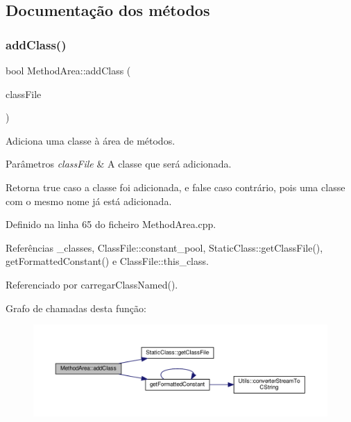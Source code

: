 \subsection{Documentação dos métodos}
\mbox{\label{classMethodArea_a9e4e378de46c1a9836820d86cd9dadb8}} 
\subsubsection{\texorpdfstring{add\+Class()}{addClass()}}
{\footnotesize\ttfamily bool Method\+Area\+::add\+Class (\begin{DoxyParamCaption}\item[{\hyperlink{classStaticClass}{Static\+Class} $\ast$}]{class\+File }\end{DoxyParamCaption})\hspace{0.3cm}{\ttfamily [private]}}



Adiciona uma classe à área de métodos. 


\begin{DoxyParams}{Parâmetros}
{\em class\+File} & A classe que será adicionada. \\
\hline
\end{DoxyParams}
\begin{DoxyReturn}{Retorna}
{\ttfamily true} caso a classe foi adicionada, e {\ttfamily false} caso contrário, pois uma classe com o mesmo nome já está adicionada. 
\end{DoxyReturn}


Definido na linha 65 do ficheiro Method\+Area.\+cpp.



Referências \+\_\+classes, Class\+File\+::constant\+\_\+pool, Static\+Class\+::get\+Class\+File(), get\+Formatted\+Constant() e Class\+File\+::this\+\_\+class.



Referenciado por carregar\+Class\+Named().

Grafo de chamadas desta função\+:\nopagebreak
\begin{figure}[H]
\begin{center}
\leavevmode
\includegraphics[width=350pt]{classMethodArea_a9e4e378de46c1a9836820d86cd9dadb8_cgraph}
\end{center}
\end{figure}
\mbox{\label{classMethodArea_a6e5cd27f3133d70a8c56c5daf9190ba6}} 
